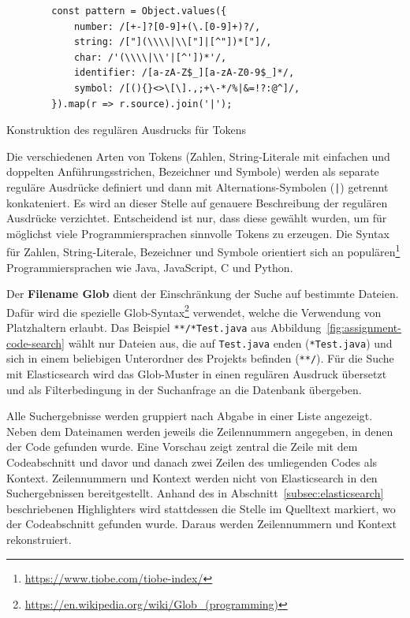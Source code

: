 \begin{listing}
    \centering
    \begin{verbatim}
        const pattern = Object.values({
            number: /[+-]?[0-9]+(\.[0-9]+)?/,
            string: /["](\\\\|\\["]|[^"])*["]/,
            char: /'(\\\\|\\'|[^'])*'/,
            identifier: /[a-zA-Z$_][a-zA-Z0-9$_]*/,
            symbol: /[(){}<>\[\].,;+\-*/%|&=!?:@^]/,
        }).map(r => r.source).join('|');
    \end{verbatim}
    \caption{Konstruktion des regulären Ausdrucks für Tokens}
    \label{lst:code-search-regex-builder}
\end{listing}

Die verschiedenen Arten von Tokens (Zahlen, String-Literale mit einfachen und doppelten Anführungsstrichen, Bezeichner und Symbole) werden als separate reguläre Ausdrücke definiert und dann mit Alternations-Symbolen (\texttt{|}) getrennt konkateniert.
Es wird an dieser Stelle auf genauere Beschreibung der regulären Ausdrücke verzichtet.
Entscheidend ist nur, dass diese gewählt wurden, um für möglichst viele Programmiersprachen sinnvolle Tokens zu erzeugen.
Die Syntax für Zahlen, String-Literale, Bezeichner und Symbole orientiert sich an populären\footnote{
    \url{https://www.tiobe.com/tiobe-index/}
} Programmiersprachen wie Java, JavaScript, C und Python.

Der \textbf{Filename Glob} dient der Einschränkung der Suche auf bestimmte Dateien.
Dafür wird die spezielle Glob-Syntax\footnote{
    \url{https://en.wikipedia.org/wiki/Glob_(programming)}
} verwendet, welche die Verwendung von Platzhaltern erlaubt.
Das Beispiel \texttt{**/*Test.java} aus Abbildung~\ref{fig:assignment-code-search} wählt nur Dateien aus, die auf \texttt{Test.java} enden (\texttt{*Test.java}) und sich in einem beliebigen Unterordner des Projekts befinden (\texttt{**/}).
Für die Suche mit Elasticsearch wird das Glob-Muster in einen regulären Ausdruck übersetzt und als Filterbedingung in der Suchanfrage an die Datenbank übergeben.

Alle Suchergebnisse werden gruppiert nach Abgabe in einer Liste angezeigt.
Neben dem Dateinamen werden jeweils die Zeilennummern angegeben, in denen der Code gefunden wurde.
Eine Vorschau zeigt zentral die Zeile mit dem Codeabschnitt und davor und danach zwei Zeilen des umliegenden Codes als Kontext.
Zeilennummern und Kontext werden nicht von Elasticsearch in den Suchergebnissen bereitgestellt.
Anhand des in Abschnitt~\ref{subsec:elasticsearch} beschriebenen Highlighters wird stattdessen die Stelle im Quelltext markiert, wo der Codeabschnitt gefunden wurde.
Daraus werden Zeilennummern und Kontext rekonstruiert.

